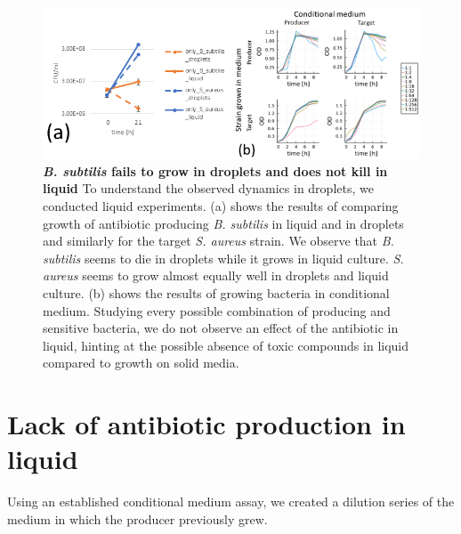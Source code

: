 \begin{figure}
\centering
\includegraphics[width=\linewidth]{graphics/2025_09_28_droplets_fig6.png}
\caption{\textbf{\textit{B. subtilis} fails to grow in droplets and does not kill in liquid} To understand the observed dynamics in droplets, we conducted liquid experiments. (a) shows the results of comparing growth of antibiotic producing \textit{B. subtilis} in liquid and in droplets and similarly for the target \textit{S. aureus} strain. We observe that \textit{B. subtilis} seems to die in droplets while it grows in liquid culture. \textit{S. aureus} seems to grow almost equally well in droplets and liquid culture. (b) shows the results of growing bacteria in conditional medium. Studying every possible combination of producing and sensitive bacteria, we do not observe an effect of the antibiotic in liquid, hinting at the possible absence of toxic compounds in liquid compared to growth on solid media.}
\label{fig:results_liquid_vs_drop_supernatant}
\end{figure}

\section{Lack of antibiotic production in liquid}
Using an established conditional medium assay, we created a dilution series of the medium in which the producer previously grew. 